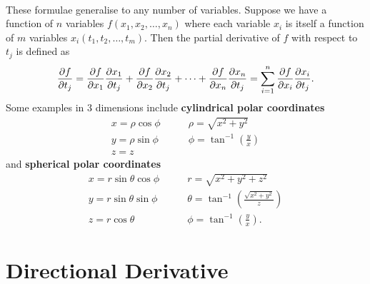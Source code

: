 \documentclass[../multivariate_calculus.tex]{subfiles}
\begin{document}
        \paragraph{}
        These formulae generalise to any number of variables.
        Suppose we have a function of $n$ variables $f(x_1,x_2,\dots,x_n)$ where each variable $x_i$ is itself a function of $m$ variables $x_i(t_1,t_2,\dots,t_m)$.
        Then the partial derivative of $f$ with respect to $t_j$ is defined as
        \begin{equation}
            \frac{\partial f}{\partial t_j}=\frac{\partial f}{\partial x_1}\frac{\partial x_1}{\partial t_j}+\frac{\partial f}{\partial x_2}\frac{\partial x_2}{\partial t_j}+\dots+\frac{\partial f}{\partial x_n}\frac{\partial x_n}{\partial t_j}=\sum_{i=1}^n\frac{\partial f}{\partial x_i}\frac{\partial x_i}{\partial t_j}.
        \end{equation}
        Some examples in 3 dimensions include \textbf{cylindrical polar coordinates}
        \begin{align}
            x=\rho\cos\phi\quad&\quad\rho=\sqrt{x^2+y^2}\\
            y=\rho\sin\phi\quad&\quad\phi=\tan^{-1}\left(\frac{y}{x}\right)\\
            z=z\quad&
        \end{align}
        and \textbf{spherical polar coordinates}
        \begin{align}
            x=r\sin\theta\cos\phi\quad&\quad r=\sqrt{x^2+y^2+z^2}\\
            y=r\sin\theta\sin\phi\quad&\quad\theta=\tan^{-1}\left(\frac{\sqrt{x^2+y^2}}{z}\right)\\
            z=r\cos\theta\quad&\quad\phi=\tan^{-1}\left(\frac{y}{x}\right).
        \end{align}

    \section{Directional Derivative}
\end{document}
